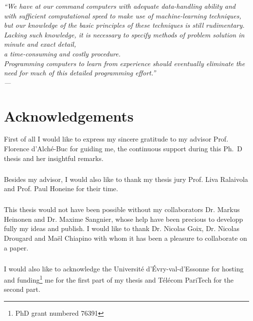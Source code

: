 

\begin{flushright}{\slshape
``We have at our command computers with adequate data-handling ability and with
sufficient computational speed to make use of machine-learning techniques, \\
but our knowledge of the basic principles of these techniques is still
rudimentary. \\
Lacking such knowledge, it is necessary to specify methods of
problem solution in minute and exact detail, \\
a time-consuming and costly procedure. \\
Programming computers to learn from experience should eventually
eliminate the need for much of this detailed programming effort.'' \\
--- 
\citep{samuel1959some}}
\end{flushright}

\bigskip


\begingroup

\let\clearpage\relax
\let\cleardoublepage\relax
\let\cleardoublepage\relax

\chapter*{Acknowledgements}

First of all I would like to express my sincere gratitude to my advisor Prof.
Florence d'Alch\'e-Buc for guiding me, the continuous support during this
Ph.~D thesis and her insightful remarks.
\paragraph{}
Besides my advisor, I would also like to thank my thesis jury Prof. Liva
Ralaivola and Prof. Paul Honeine for their time.
\paragraph{}
This thesis would not have been possible without my collaborators Dr. Markus
Heinonen and Dr. Maxime Sangnier, whose help have been precious to developp
fully my ideas and publish. I would like to thank Dr. Nicolas Goix, Dr. Nicolas
Drougard and Ma\"el Chiapino with whom it has been a pleasure to collaborate on
a paper.
\paragraph{}
I would also like to acknowledge the Universit\'e d'\'Evry-val-d'Essonne for
hosting and funding\footnote{PhD grant numbered 76391} me for the first part
of my thesis and T\'el\'ecom PariTech for the second part.

\endgroup

\chapterend
